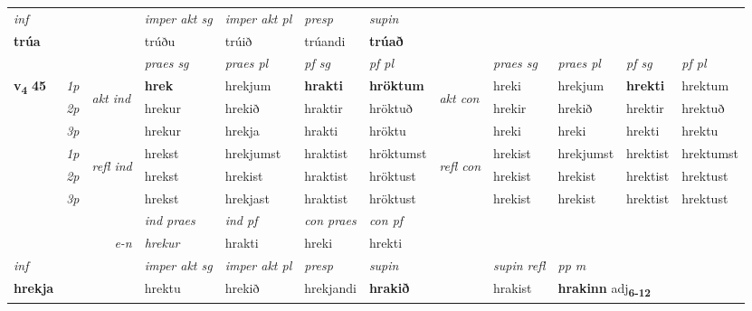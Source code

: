 \begin{longtable}[l]{X>{\footnotesize\itshape}llXXXXlXXXX}
   {\textit{inf}} & &  & \textit{imper akt sg} & \textit{imper akt pl}   & \textit{presp} & \textit{supin}   \\*
  {\textbf{trúa}} & && trúðu  & trúið   & trúandi &  \textbf{trúað}   \\*

\midrule

 & &   & \textit{praes sg}  & \textit{praes pl}    & \textit{ pf sg} & \textit{pf pl} & & \textit{praes sg}  & \textit{praes pl}    & \textit{pf sg} & \textit{pf pl }  \\ \cmidrule{4-7} \cmidrule{9-12}
 \multirow{2}{*}{{{\textbf{v{\textsubscript{4}}} \Large{\textbf{45}}}}}  & 1p & \multirow{3}{*}{\begin{turn}{90}\textit{akt ind}\end{turn}} & \textbf{hrek} & hrekjum & \textbf{hrakti} & \textbf{hröktum} & \multirow{3}{*}{\begin{turn}{90}\textit{akt con}\end{turn}} &hreki & hrekjum & \textbf{hrekti} & hrektum\\*
 & 2p &  &  hrekur  & hrekið & hraktir & hröktuð & & hrekir & hrekið & hrektir & hrektuð \\*
 & 3p &  & hrekur & hrekja & hrakti & hröktu & & hreki & hreki& hrekti & hrektu \\*
\cmidrule{4-7} \cmidrule{9-12}
 & 1p & \multirow{3}{*}{\begin{turn}{90}\textit{refl ind}\end{turn}}  & hrekst & hrekjumst & hraktist & hröktumst & \multirow{3}{*}{\begin{turn}{90}\textit{refl con}\end{turn}}  &hrekist & hrekjumst & hrektist & hrektumst \\*
 & 2p &  & hrekst & hrekist & hraktist & hröktust & &hrekist & hrekist & hrektist & hrektust \\*
 & 3p  & & hrekst & hrekjast & hraktist & hröktust & & hrekist & hrekist& hrektist & hrektust \\*
\cmidrule{4-7} \cmidrule{9-12}

   && &  \textit{ind praes} & \textit{ind pf} & \textit{con praes} & \textit{con pf} \\*
\multicolumn{3}{r}{\textit{e-n}} & hrekur & hrakti & hreki & hrekti \\*

\cmidrule{4-7}
   {\textit{inf}} & &  & \textit{imper akt sg} & \textit{imper akt pl}   & \textit{presp} & \textit{supin} && \textit{supin refl} & \textit{pp m} \\*
  {\textbf{hrekja}} & && hrektu  & hrekið   & hrekjandi &  \textbf{hrakið} && hrakist & \multicolumn{2}{l}{\textbf{hrakinn} adj\textbf{\textsubscript{6-12}}} \\*


\end{longtable}
